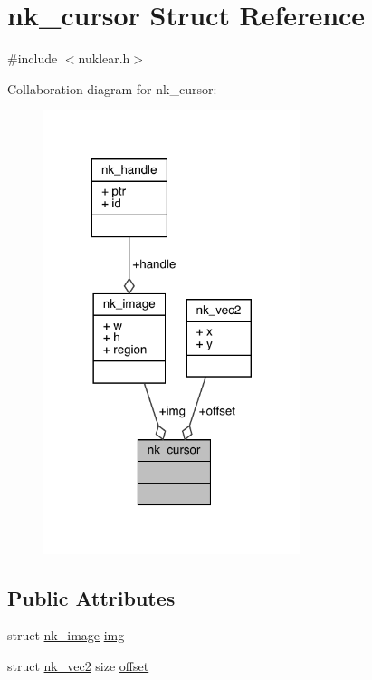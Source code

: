 \hypertarget{structnk__cursor}{}\section{nk\+\_\+cursor Struct Reference}
\label{structnk__cursor}


{\ttfamily \#include $<$nuklear.\+h$>$}



Collaboration diagram for nk\+\_\+cursor\+:
\nopagebreak
\begin{figure}[H]
\begin{center}
\leavevmode
\includegraphics[width=212pt]{structnk__cursor__coll__graph}
\end{center}
\end{figure}
\subsection*{Public Attributes}
\begin{DoxyCompactItemize}
\item 
struct \mbox{\hyperlink{structnk__image}{nk\+\_\+image}} \mbox{\hyperlink{structnk__cursor_ae85598fd872f474a4e63e92bbee10a92}{img}}
\item 
struct \mbox{\hyperlink{structnk__vec2}{nk\+\_\+vec2}} size \mbox{\hyperlink{structnk__cursor_ae01b7938eb679481a8ef549c27a59080}{offset}}
\end{DoxyCompactItemize}


